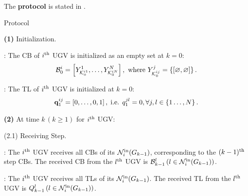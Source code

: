 	The \textbf{{\proto} protocol} is stated in .
	\begin{algorithm}
		\caption{{\proto} Protocol}
		\label{alg:lifo}
		\begin{algorithmic}
			\State \textbf{(1)} Initialization.
			
			\CB: 
			The CB of $i^\text{th}$ UGV is initialized as an empty set at $k=0$:
			\small\begin{equation*}
				{\mathcal{B}^i_0=\left[ Y^1_{\mathcal{K}^{i1}_{0}},\dots,Y^N_{\mathcal{K}^{iN}_{0}}\right], \text{ where } Y^j_{\mathcal{K}^{ij}_0} = \left\lbrace\left[ \varnothing,\varnothing\right]\right\rbrace.}
			\end{equation*}\normalsize
			
			\TL:
			The TL of $i^\text{th}$ UGV is initialized at $k=0$:
			\small\begin{equation*}
				\mathbf{q}^{ij}_1 = \left[0,\dots,0,1\right],\;\text{i.e. } q^{jl}_1=0, \forall j,l\in \left\lbrace 1\dots,N\right\rbrace.
			\end{equation*}\normalsize
			
			\State \textbf{(2)} At time $k\,(k\geq 1)$ for $i^\text{th}$ UGV:	
			
			\State (2.1) Receiving Step.
			
			\CB:	The $i^\text{th}$ UGV receives all CBs of its {\inbhd} $\mathcal{N}^\text{in}_i(G_{k-1})$,
			corresponding to the $(k-1)^\text{th}$ step CBs.
			The received CB from the $l^\text{th}$ UGV is $\mathcal{B}^l_{k-1}\,(l\in\mathcal{N}^\text{in}_i(G_{k-1}))$.
			
			\TL: The $i^\text{th}$ UGV receives all TLs of its {\inbhd} $\mathcal{N}^\text{in}_i(G_{k-1})$.
			The received TL from the $l^\text{th}$ UGV is $Q^l_{k-1}\,(l\in\mathcal{N}^\text{in}_i(G_{k-1}))$.
			\newline
			

\end{algorithmic}
\end{algorithm}
